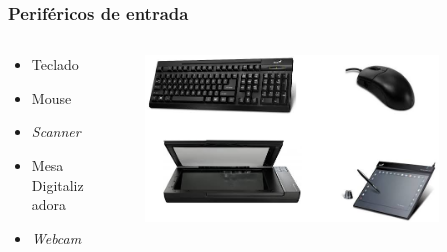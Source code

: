 \documentclass[aspectratio=169,
				xcolor=table]{beamer}
\begin{document}
	\begin{frame}
		\frametitle{Periféricos de entrada}
		\begin{columns}[t]
			\begin{column}{0.35\textwidth}
				\begin{itemize}
					\item Teclado
					\item Mouse
					\item \textit{Scanner}
					\item Mesa Digitalizadora
					\item \textit{Webcam}
					
				\end{itemize}
			\end{column}
			\begin{column}{0.65\textwidth}
				\begin{figure}
					\centering
					\includegraphics[width=0.9\textwidth, keepaspectratio]{../figs/cap04/entrada} 
					
				\end{figure}
			\end{column}
		\end{columns}
	
	\end{frame}
	
\end{document}
